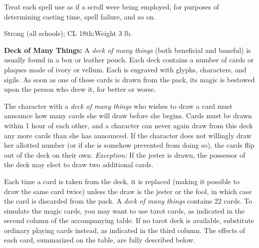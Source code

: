 Treat each spell use as if a scroll were being employed, for purposes of determining 
casting time, spell failure, and so on.

Strong (all schools); CL 18th;Weight 3 lb.

\vspace{12pt}
\textbf{Deck of Many Things: }A \textit{deck of many things }(both beneficial and 
baneful) is usually found in a box or leather pouch. Each deck contains a number 
of cards or plaques made of ivory or vellum. Each is engraved with glyphs, characters, 
and sigils. As soon as one of these cards is drawn from the pack, its magic is 
bestowed upon the person who drew it, for better or worse.

The character with a \textit{deck of many things }who wishes to draw a card must 
announce how many cards she will draw before she begins. Cards must be drawn within 
1 hour of each other, and a character can never again draw from this deck any more 
cards than she has announced. If the character does not willingly draw her allotted 
number (or if she is somehow prevented from doing so), the cards flip out of the 
deck on their own. \textit{Exception: }If the jester is drawn, the possessor of 
the deck may elect to draw two additional cards.

Each time a card is taken from the deck, it is replaced (making it possible to 
draw the same card twice) unless the draw is the jester or the fool, in which case 
the card is discarded from the pack. A \textit{deck of many things }contains 22 
cards. To simulate the magic cards, you may want to use tarot cards, as indicated 
in the second column of the accompanying table. If no tarot deck is available, 
substitute ordinary playing cards instead, as indicated in the third column. The 
effects of each card, summarized on the table, are fully described below.

